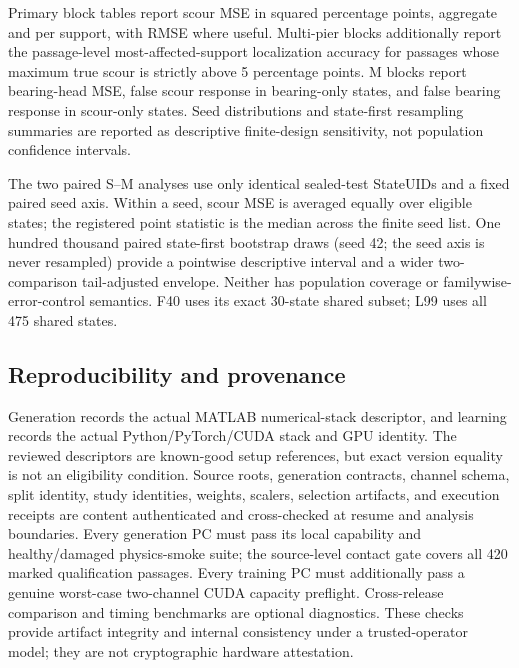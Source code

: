 Primary block tables report scour MSE in squared percentage points, aggregate
and per support, with RMSE where useful. Multi-pier blocks additionally report
the passage-level most-affected-support localization accuracy for passages
whose maximum true scour is strictly above 5 percentage points. M blocks report
bearing-head MSE, false scour response in bearing-only states, and false
bearing response in scour-only states. Seed distributions and state-first
resampling summaries are reported as descriptive finite-design sensitivity,
not population confidence intervals.

The two paired S--M analyses use only identical sealed-test StateUIDs and a
fixed paired seed axis. Within a seed, scour MSE is averaged equally over
eligible states; the registered point statistic is the median across the finite
seed list. One hundred thousand paired state-first bootstrap draws (seed 42;
the seed axis is never resampled) provide a pointwise descriptive interval and
a wider two-comparison tail-adjusted envelope. Neither has population coverage
or familywise-error-control semantics. F40 uses its exact 30-state shared
subset; L99 uses all 475 shared states.

\subsection{Reproducibility and provenance}
\label{sec:reproducibility}

Generation records the actual MATLAB numerical-stack descriptor, and learning
records the actual Python/PyTorch/CUDA stack and GPU identity. The reviewed
descriptors are known-good setup references, but exact version equality is not
an eligibility condition. Source roots, generation contracts, channel schema,
split identity, study identities, weights, scalers, selection artifacts, and
execution receipts are content authenticated and cross-checked at resume and
analysis boundaries. Every generation PC must pass its local capability and
healthy/damaged physics-smoke suite; the source-level contact gate covers all
420 marked qualification passages. Every training PC must additionally pass a
genuine worst-case two-channel CUDA capacity preflight. Cross-release comparison
and timing benchmarks are optional diagnostics. These checks provide artifact
integrity and internal consistency under a trusted-operator model; they are not
cryptographic hardware attestation.
